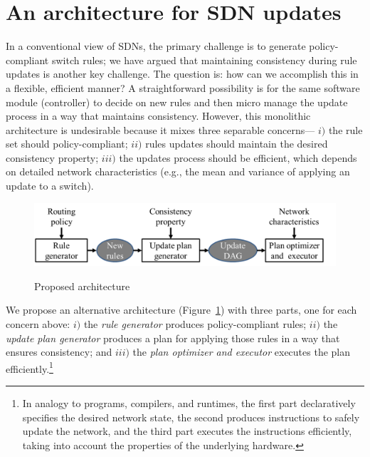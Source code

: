 \section{An architecture for SDN updates}
\label{sec:discussion}

In a conventional view of SDNs, the primary challenge is to generate policy-compliant switch rules; we have argued that maintaining consistency during rule updates is another key challenge. The question is: how can we accomplish this in a flexible, efficient manner? A straightforward possibility is for the same software module (controller) to decide on new rules and then micro manage the update process in a way that maintains consistency. However, this monolithic architecture is undesirable because it mixes three separable concerns--- $i)$ the rule set should policy-compliant; $ii)$ rules updates should maintain the desired consistency property; $iii)$ the updates process should be efficient, which depends on detailed network characteristics (e.g., the mean and variance of applying an update to a switch).

\begin{figure}[t!]
  \centering
  \includegraphics[width=\columnwidth]{figures/arch.png}\\
  \caption{Proposed architecture}\label{fig:arch}
\end{figure}



We propose an alternative architecture (Figure~\ref{fig:arch}) with three parts, one for each concern above: $i)$ the {\em rule generator} produces policy-compliant rules; $ii)$ the {\em update plan generator} produces a plan for applying those rules in a way that ensures consistency; and $iii)$  the {\em plan optimizer and executor} executes the plan efficiently.\footnote{In analogy to programs, compilers, and runtimes, the first part declaratively specifies the desired network state, the second produces instructions to safely update the network, and the third part executes the instructions efficiently, taking into account the properties of the underlying hardware.}

